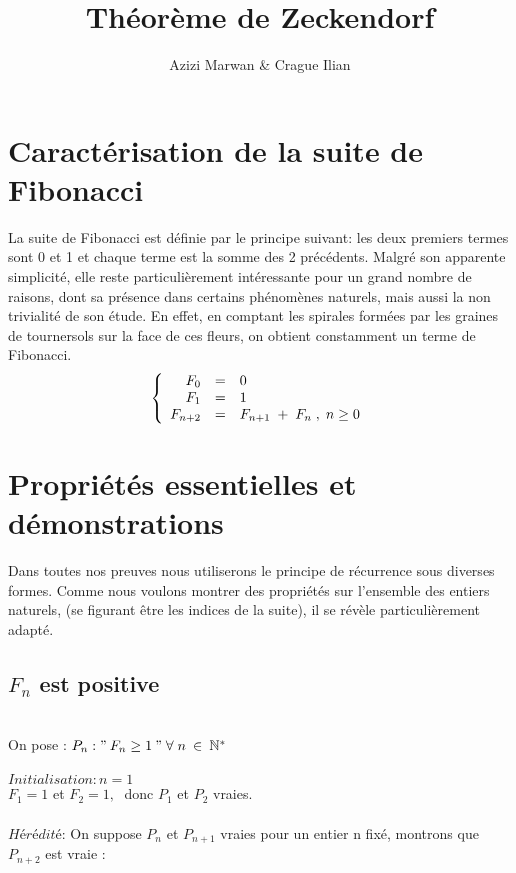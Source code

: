 \documentclass{article}
\title{Théorème de Zeckendorf}
\author{Azizi Marwan & Crague Ilian}
\date{}
\begin{document}
\maketitle


\section{Caractérisation de la suite de Fibonacci}

La suite de Fibonacci est définie par le principe suivant: les deux premiers termes sont 0 et 1 et chaque terme est la somme des 2 précédents. Malgré son apparente simplicité, elle reste particulièrement intéressante pour un grand nombre de raisons, dont sa présence dans certains phénomènes naturels, mais aussi la non trivialité de son étude. En effet, en comptant les spirales formées par les graines de tournersols sur la face de ces fleurs, on obtient constamment un terme de Fibonacci.
\[

\left \{
   \begin{array}{r c l}
      F_0  & = & 0 \\
      F_1& = & 1 \\
      F_{n+2} & = & F_{n+1} \; + \; F_n\;,\; n \geq 0
   \end{array}
   \right .
   
\]



\section{Propriétés essentielles et démonstrations}

Dans toutes nos preuves nous utiliserons le principe de récurrence sous diverses formes. 
Comme nous voulons montrer des propriétés sur l'ensemble des entiers naturels, (se figurant être les indices de la suite), il se révèle particulièrement adapté.


\subsection{$ F_{n}$ est positive }\\

On pose : $ P_n : "\:F_n \geq 1\:" \; \forall \;  n \: \in \: \mathbb{N}^{*} $\\
\\
$Initialisation : n = 1$\\

$F_1 = 1$ et $F_2 = 1, \;$
donc $ P_1$ et $ P_2$ vraies.\\ \\
$Hérédité $: On suppose $P_n$ et $P_{n+1}$ vraies pour un entier n fixé, montrons que $P_{n+2}$ est vraie : \\
\end{document}
